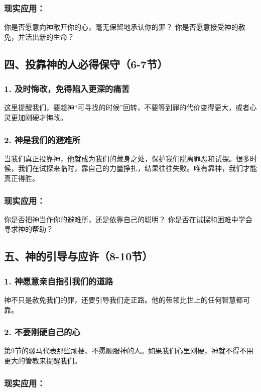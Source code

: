 \documentclass[a4paper, 12pt]{article}
\begin{document}
\subsubsection*{现实应用：}

你是否愿意向神敞开你的心，毫无保留地承认你的罪？
你是否愿意接受神的赦免，并活出新的生命？
\subsection*{四、投靠神的人必得保守（6-7节）}

\subsubsection*{1. 及时悔改，免得陷入更深的痛苦}
这里提醒我们，要趁神“可寻找的时候”回转，不要等到罪的代价变得更大，或者心灵更加刚硬才悔改。

\subsubsection*{2. 神是我们的避难所}
当我们真正投靠神，他就成为我们的藏身之处，保护我们脱离罪恶和试探。很多时候，我们在试探来临时，靠自己的力量挣扎，结果往往失败。唯有靠神，我们才能真正得胜。

\subsubsection*{现实应用：}

你是否把神当作你的避难所，还是依靠自己的聪明？
你是否在试探和困难中学会寻求神的帮助？
\subsection*{五、神的引导与应许（8-10节）}

\subsubsection*{1. 神愿意亲自指引我们的道路}
神不只是赦免我们的罪，还要引导我们走正路。他的带领比世上的任何智慧都可靠。

\subsubsection*{2. 不要刚硬自己的心}
第9节的骡马代表那些顽梗、不愿顺服神的人。如果我们心里刚硬，神就不得不用更大的管教来提醒我们。

\subsubsection*{现实应用：}
\end{document}

